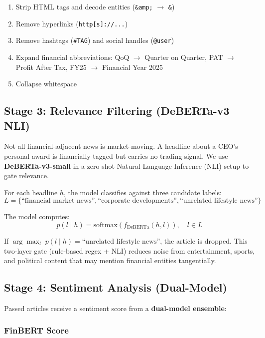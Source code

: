 \documentclass[12pt, a4paper]{article}
\begin{document}
\begin{enumerate}[leftmargin=2em,noitemsep]
    \item Strip HTML tags and decode entities (\texttt{\&amp;} $\to$ \texttt{\&})
    \item Remove hyperlinks (\texttt{http[s]://...})
    \item Remove hashtags (\texttt{\#TAG}) and social handles (\texttt{@user})
    \item Expand financial abbreviations: QoQ $\to$ Quarter on Quarter, PAT $\to$ Profit After Tax, FY25 $\to$ Financial Year 2025
    \item Collapse whitespace
\end{enumerate}

\subsection{Stage 3: Relevance Filtering (DeBERTa-v3 NLI)}

Not all financial-adjacent news is market-moving. A headline about a CEO's personal award is financially tagged but carries no trading signal. We use \textbf{DeBERTa-v3-small} in a zero-shot Natural Language Inference (NLI) setup to gate relevance.

For each headline $h$, the model classifies against three candidate labels:
\[
    L = \{\text{``financial market news''}, \text{``corporate developments''}, \text{``unrelated lifestyle news''}\}
\]

The model computes:
\begin{equation}
    p(l \mid h) = \text{softmax}\!\left(f_{\text{DeBERTa}}(h, l)\right), \quad l \in L
\end{equation}

If $\arg\max_l\; p(l \mid h) = \text{``unrelated lifestyle news''}$, the article is dropped. This two-layer gate (rule-based regex + NLI) reduces noise from entertainment, sports, and political content that may mention financial entities tangentially.

\subsection{Stage 4: Sentiment Analysis (Dual-Model)}

Passed articles receive a sentiment score from a \textbf{dual-model ensemble}:

\subsubsection{FinBERT Score}
\end{document}

